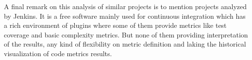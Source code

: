 A final remark on this analysis of similar projects is to mention projects analyzed by Jenkins. It is a free software mainly used for continuous integration which has a rich environment of plugins where some of them provide metrics like test coverage and basic complexity metrics. But none of them providing interpretation of the results, any kind of flexibility on metric definition and laking the historical visualization of code metrics results.
